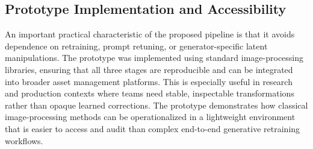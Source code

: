 \documentclass[runningheads]{llncs}
\begin{document}
\subsection{Prototype Implementation and Accessibility}

An important practical characteristic of the proposed pipeline is that it avoids dependence on retraining, prompt retuning, or generator-specific latent manipulations. The prototype was implemented using standard image-processing libraries, ensuring that all three stages are reproducible and can be integrated into broader asset management platforms. This is especially useful in research and production contexts where teams need stable, inspectable transformations rather than opaque learned corrections. The prototype demonstrates how classical image-processing methods can be operationalized in a lightweight environment that is easier to access and audit than complex end-to-end generative retraining workflows.

\begin{table}[ht]
\footnotesize
\centering
\begin{minipage}{0.48\linewidth}
\centering
\caption{Stage roles and trade-offs}
\label{tab:stages}
\end{minipage}
\hfill
\begin{minipage}{0.48\linewidth}
\centering
\caption{Structured subset reported}
\label{tab:subset}
\end{minipage}
\end{table}
\end{document}
